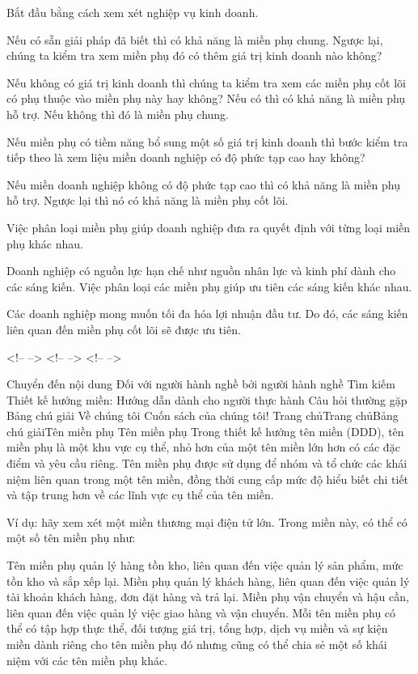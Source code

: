 Bắt đầu bằng cách xem xét nghiệp vụ kinh doanh.

Nếu có sẵn giải pháp đã biết thì có khả năng là miền phụ chung. Ngược lại, chúng ta kiểm tra xem miền phụ đó có thêm giá trị kinh doanh nào không?

Nếu không có giá trị kinh doanh thì chúng ta kiểm tra xem các miền phụ cốt lõi có phụ thuộc vào miền phụ này hay không? Nếu có thì có khả năng là miền phụ hỗ trợ. Nếu không thì đó là miền phụ chung.

Nếu miền phụ có tiềm năng bổ sung một số giá trị kinh doanh thì bước kiểm tra tiếp theo là xem liệu miền doanh nghiệp có độ phức tạp cao hay không?

Nếu miền doanh nghiệp không có độ phức tạp cao thì có khả năng là miền phụ hỗ trợ. Ngược lại thì nó có khả năng là miền phụ cốt lõi.


Việc phân loại miền phụ giúp doanh nghiệp đưa ra quyết định với từng loại miền phụ khác nhau.

Doanh nghiệp có nguồn lực hạn chế như nguồn nhân lực và kinh phí dành cho các sáng kiến. Việc phân loại các miền phụ giúp ưu tiên các sáng kiến khác nhau.

Các doanh nghiệp mong muốn tối đa hóa lợi nhuận đầu tư. Do đó, các sáng kiến liên quan đến miền phụ cốt lõi sẽ được ưu tiên.

%



<!--  -->
<!--  -->
<!--  -->


Chuyển đến nội dung
Đối với người hành nghề bởi người hành nghề
Tìm kiếm
Thiết kế hướng miền: Hướng dẫn dành cho người thực hành
Câu hỏi thường gặp
Bảng chú giải
Về chúng tôi
Cuốn sách của chúng tôi!
Trang chủTrang chủBảng chú giảiTên miền phụ
Tên miền phụ
Trong thiết kế hướng tên miền (DDD), tên miền phụ là một khu vực cụ thể, nhỏ hơn của một tên miền lớn hơn có các đặc điểm và yêu cầu riêng. Tên miền phụ được sử dụng để nhóm và tổ chức các khái niệm liên quan trong một tên miền, đồng thời cung cấp mức độ hiểu biết chi tiết và tập trung hơn về các lĩnh vực cụ thể của tên miền.

Ví dụ: hãy xem xét một miền thương mại điện tử lớn. Trong miền này, có thể có một số tên miền phụ như:

Tên miền phụ quản lý hàng tồn kho, liên quan đến việc quản lý sản phẩm, mức tồn kho và sắp xếp lại.
Miền phụ quản lý khách hàng, liên quan đến việc quản lý tài khoản khách hàng, đơn đặt hàng và trả lại.
Miền phụ vận chuyển và hậu cần, liên quan đến việc quản lý việc giao hàng và vận chuyển.
Mỗi tên miền phụ có thể có tập hợp thực thể, đối tượng giá trị, tổng hợp, dịch vụ miền và sự kiện miền dành riêng cho tên miền phụ đó nhưng cũng có thể chia sẻ một số khái niệm với các tên miền phụ khác.

